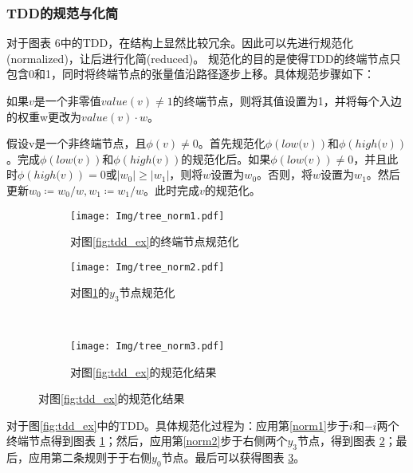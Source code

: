 \subsubsection{TDD的规范与化简}
对于图表 6中的TDD，在结构上显然比较冗余。因此可以先进行规范化(normalized)，让后进行化简(reduced)\citep{Hong_2022}。
规范化的目的是使得TDD的终端节点只包含0和1，同时将终端节点的张量值沿路径逐步上移。具体规范步骤如下：
\begin{myen}
    \item 如果$v$是一个非零值$value\left(v\right)\neq 1$的终端节点，则将其值设置为1，并将每个入边的权重w更改为$value\left(v\right)\cdot w$。\label{norm1}
    \item 假设v是一个非终端节点，且$\phi\left(v\right)\neq 0$。首先规范化$\phi\left.\left(low(v\right)\right)$和$\phi\left.\left(high(v\right)\right)$。完成$\phi\left.\left(low(v\right)\right)$和$\phi\left.\left(high(v\right)\right)$的规范化后。如果$\phi\left.\left(low(v\right)\right)\neq 0$，并且此时$\phi\left.\left(high(v\right)\right)=0$或$\left|w_0\right|\geq\left|w_1\right|$，则将$w$设置为$w_0$。否则，将$w$设置为$w_1$。然后更新$w_0≔w_0/w,w_1≔w_1/w$。此时完成$v$的规范化。\label{norm2}
\end{myen}

\begin{figure}[!htbp]
    \centering
    \begin{subfigure}[b]{0.4\textwidth}
        \centering
        \texttt{[image: Img/tree\_norm1.pdf]}
        \caption{对图\ref{fig:tdd_ex}的终端节点规范化}
        \label{fig:tdd-norma}
    \end{subfigure}
    \begin{subfigure}[b]{0.4\textwidth}
        \centering
        \texttt{[image: Img/tree\_norm2.pdf]}
        \caption{对图\ref{fig:tdd-norma}的$y_3$节点规范化}
        \label{fig:tdd-normb}
    \end{subfigure}
    \\
    \begin{subfigure}[b]{0.8\textwidth}
        \centering
        \texttt{[image: Img/tree\_norm3.pdf]}
        \caption{对图\ref{fig:tdd_ex}的规范化结果}
        \label{fig:tdd-normc}
    \end{subfigure}
    \label{fig:tdd-norm}
\end{figure}
对于图\ref{fig:tdd_ex}中的TDD。具体规范化过程为：应用第\ref{norm1}步于$i$和$-i$两个终端节点得到图表 \ref{fig:tdd-norma}；然后，应用第\ref{norm2}步于右侧两个$y_3$节点，得到图表 \ref{fig:tdd-normb}；最后，应用第二条规则于于右侧$y_0$节点。最后可以获得图表 \ref{fig:tdd-normc}。

